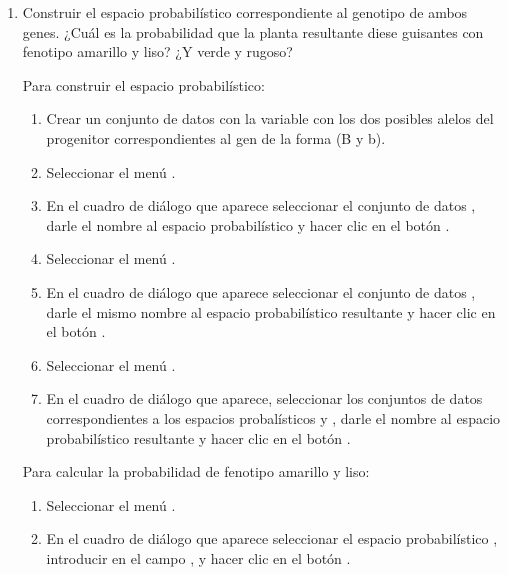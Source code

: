\begin{enumerate}[leftmargin=*]
\begin{enumerate}
\item Construir el espacio probabilístico correspondiente al genotipo de ambos genes. 
¿Cuál es la probabilidad que la planta resultante diese guisantes con fenotipo amarillo y liso? 
¿Y verde y rugoso?
\begin{indicacion}
Para construir el espacio probabilístico: 
\begin{enumerate}
\item Crear un conjunto de datos  con la variable  con los dos posibles alelos del
progenitor correspondientes al gen de la forma (B y b).
\item Seleccionar el menú .
\item En el cuadro de diálogo que aparece seleccionar el conjunto de datos , darle el nombre
 al espacio probabilístico y hacer clic en el botón .
\item Seleccionar el menú .
\item En el cuadro de diálogo que aparece seleccionar el conjunto de datos , darle el mismo nombre al espacio
probabilístico resultante y hacer clic en el botón . 
\item Seleccionar el menú .
\item En el cuadro de diálogo que aparece, seleccionar los conjuntos de datos correspondientes a los espacios probalísticos
 y ,  darle el nombre  al espacio
probabilístico resultante y hacer clic en el botón .
\end{enumerate}
Para calcular la probabilidad de fenotipo amarillo y liso:
\begin{enumerate}
\item Seleccionar el menú .
\item En el cuadro de diálogo que aparece seleccionar el espacio probabilístico , introducir
 en el campo , y hacer clic en el botón .

\end{enumerate}
\end{indicacion}
\end{enumerate}
\end{enumerate}
